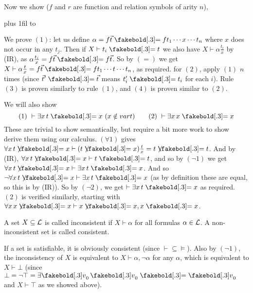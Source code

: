 Now we show ($f$ and $r$ are function and relation symbols of arity $n$),

\medskip
\tabskip=0pt plus 1fil
{\jot\halign to}
\medskip

We prove $(1)$: let us define $\alpha=f\vec t\eq ft_1\cdots x\cdots t_n$ where $x$ does not occur  in any $t_j$.
Then if $X\vdash t_i\eq t$ we also have $X\vdash\alpha\frac{t_i}x$ by (IR), as $\alpha\frac{t_i}x=f\vec t\eq f\vec t$.
So by $(=)$ we get $X\vdash\alpha\frac tx=f\vec t\eq ft_1\cdots t\cdots t_n$, as required.
for $(2)$, apply $(1)$ $n$ times (since $\vec t'\eq\vec t$ means $t_i'\eq t_i$ for each $i$).
Rule $(3)$ is proven similarly to rule $(1)$, and $(4)$ is proven similar to $(2)$.

We will also show
$$ (1)\ \vdash\exists x\,t\eq x\ (x\notin\var t)\qquad (2)\ \vdash\exists x\,x\eq x $$
These are trivial to show semantically, but require a bit more work to show derive them using our calculus.
$(\forall1)$ gives $\forall x\,t\neqb x\vdash(t\neqb x)\frac tx=t\neqb t$.
And by (IR), $\forall x\,t\neqb x\vdash t\eq t$, and so by $(\neg1)$ we get $\forall x\,t\neqb x\vdash\exists x\,t\eq x$.
And so $\neg\forall x\,t\neqb x\vdash\exists x\,t\eq x$ (as by definition these are equal, so this is by (IR)).
So by $(\neg2)$, we get $\vdash\exists x\,t\eq x$ as required.
$(2)$ is verified similarly, starting with $\forall x\,x\neqb x\vdash x\neqb x,x\eq x$.

\bdefn

    A set $X\subseteq{\cal L}$ is called {\emphcolor inconsistent} if $X\vdash\alpha$ for all formulas $\alpha\in{\cal L}$.
    A non-inconsistent set is called {\emphcolor consistent}.

\edefn

If a set is satisfiable, it is obviously consistent (since ${\vdash}\subseteq{\vDash}$).
Also by $(\neg1)$, the inconsistency of $X$ is equivalent to $X\vdash\alpha,\neg\alpha$ for any $\alpha$, which is equivalent to $X\vdash\bot$ (since $\bot=\neg\top=\exists\v_0\,\v_0\eq\v_0$ and
$X\vdash\top$ as we showed above).


